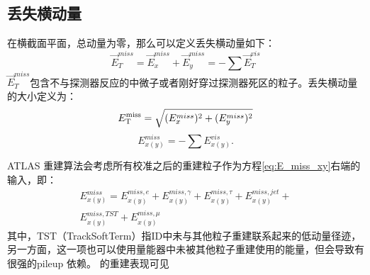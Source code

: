 \subsection{丢失横动量}\label{subsec:met_reco}
在横截面平面，总动量为零，那么可以定义丢失横动量如下：
\begin{equation}
\overrightarrow{E}_{T}^{miss}=\overrightarrow{E}_{x}^{miss}+\overrightarrow{E}_{y}^{miss}=-\sum \overrightarrow{E}_{T}^{vis}
\end{equation}
$\overrightarrow{E}_{T}^{miss}$包含不与探测器反应的中微子或者刚好穿过探测器死区的粒子。丢失横动量的大小定义为：
\begin{equation}
 E_{\text{T}}^{\text{miss}}=\sqrt{(E_x^{miss})^2+(E_y^{miss})^2}
\end{equation}
\begin{equation}\label{eq:E_miss_xy}
  E_{x(y)}^{miss}=-\sum E_{x(y)}^{vis}.
\end{equation}

ATLAS \met 重建算法\cite{Aaboud:2018tkc}会考虑所有校准之后的重建粒子作为方程\ref{eq:E_miss_xy}右端的输入，即：
\begin{equation}
\begin{aligned}
 E_{x(y)}^{miss}=E_{x(y)}^{miss,e}+E_{x(y)}^{miss,\gamma}+E_{x(y)}^{miss,\tau}+E_{x(y)}^{miss,jet}+\\
 E_{x(y)}^{miss,TST}+E_{x(y)}^{miss,\mu}
 \end{aligned}
\end{equation}
其中，TST（TrackSoftTerm）指ID中未与其他粒子重建联系起来的低动量径迹，另一方面，这一项也可以使用量能器中未被其他粒子重建使用的能量，但会导致\met 有很强的pileup 依赖。
\met 的重建表现可见\cite{Aaboud:2018tkc}
